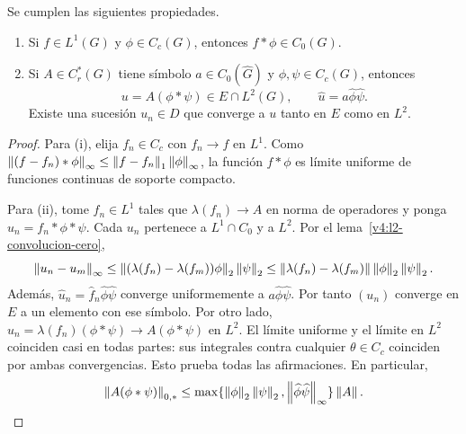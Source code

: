 \begin{lema}\label{v4:regularizacion}
Se cumplen las siguientes propiedades.
\begin{enumerate}
\item Si $f\in L^1(G)$ y $\phi\in C_c(G)$, entonces $f*\phi\in C_0(G)$.
\item Si $A\in C_r^*(G)$ tiene símbolo $a\in C_0(\widehat G)$ y $\phi,\psi\in C_c(G)$, entonces
\[
 u=A(\phi*\psi)\in E\cap L^2(G),\qquad
 \widehat u=a\widehat\phi\widehat\psi.
\]
Existe una sucesión $u_n\in D$ que converge a $u$ tanto en $E$ como en $L^2$.
\end{enumerate}
\end{lema}
\begin{proof}
Para (i), elija $f_n\in C_c$ con $f_n\to f$ en $L^1$. Como
$\left\lVert(f-f_n)*\phi\right\rVert_\infty\le\left\lVert f-f_n\right\rVert_1\left\lVert\phi\right\rVert_\infty$,
la función $f*\phi$ es límite uniforme de funciones continuas de soporte compacto.

Para (ii), tome $f_n\in L^1$ tales que $\lambda(f_n)\to A$ en norma de operadores y ponga $u_n=f_n*\phi*\psi$. Cada $u_n$ pertenece a $L^1\cap C_0$ y a $L^2$. Por el lema~\ref{v4:l2-convolucion-cero},
\[
 \left\lVert u_n-u_m\right\rVert_\infty
 \le\left\lVert(\lambda(f_n)-\lambda(f_m))\phi\right\rVert_2\left\lVert\psi\right\rVert_2
 \le\left\lVert\lambda(f_n)-\lambda(f_m)\right\rVert\left\lVert\phi\right\rVert_2\left\lVert\psi\right\rVert_2.
\]
Además, $\widehat u_n=\widehat f_n\widehat\phi\widehat\psi$ converge uniformemente a $a\widehat\phi\widehat\psi$. Por tanto $(u_n)$ converge en $E$ a un elemento con ese símbolo. Por otro lado,
$u_n=\lambda(f_n)(\phi*\psi)\to A(\phi*\psi)$ en $L^2$.
El límite uniforme y el límite en $L^2$ coinciden casi en todas partes: sus integrales contra cualquier $\theta\in C_c$ coinciden por ambas convergencias. Esto prueba todas las afirmaciones. En particular,
\[
 \left\lVert A(\phi*\psi)\right\rVert_{0,*}
 \le\max\{\left\lVert\phi\right\rVert_2\left\lVert\psi\right\rVert_2,
                 \left\lVert\widehat\phi\widehat\psi\right\rVert_\infty\}\left\lVert A\right\rVert.
\]
\end{proof}

